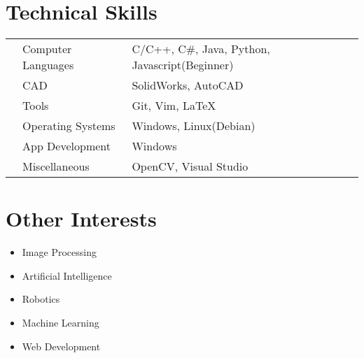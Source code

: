 \documentclass[11pt,a4paper]{moderncv}
\begin{document}
  \section{Technical Skills}
    \begin{tabular}{L{0.05cm} L{4cm} l}
      & Computer Languages   & C/C++, C\#, Java, Python, Javascript(Beginner)\vspace{2mm}\\
      & CAD                  & SolidWorks, AutoCAD \vspace{2mm}\\
      & Tools                & Git, Vim, \LaTeX \vspace{2mm}\\
      & Operating Systems    & Windows, Linux(Debian)\vspace{2mm}\\
      & App Development      & Windows \vspace{2mm}\\
      & Miscellaneous        & OpenCV, Visual Studio\vspace{2mm}
    \end{tabular}
  \section{Other Interests}
    \begin {itemize}
  \item Image Processing\vspace{2mm}
      \item Artificial Intelligence\vspace{2mm}
      \item Robotics\vspace{2mm}
      \item Machine Learning\vspace{2mm}
      \item Web Development\vspace{2mm}
    \end{itemize}
\end{document}
